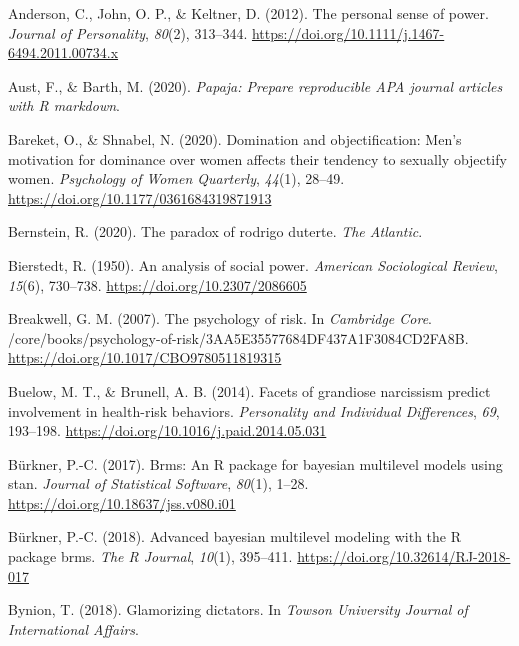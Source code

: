 \documentclass[
  donotrepeattitle,doc, 12pt, a4paper,floatsintext]{apa7}
\newlength{\cslhangindent}
\newlength{\cslentryspacingunit} %
\newenvironment{CSLReferences}[2] %
 {%
  \setlength{\parindent}{0pt}
  \ifodd #1
  \let\oldpar\par
  \def\par{\hangindent=\cslhangindent\oldpar}
  \fi
  \setlength{\parskip}{#2\cslentryspacingunit}
 }%
 {}
\begin{document}
\hypertarget{refs}{}
\begin{CSLReferences}{1}{0}
\leavevmode{}%
Anderson, C., John, O. P., \& Keltner, D. (2012). The personal sense of power. \emph{Journal of Personality}, \emph{80}(2), 313--344. \url{https://doi.org/10.1111/j.1467-6494.2011.00734.x}

\leavevmode{}%
Aust, F., \& Barth, M. (2020). \emph{Papaja: Prepare reproducible {APA} journal articles with {R} markdown}.

\leavevmode{}%
Bareket, O., \& Shnabel, N. (2020). Domination and objectification: Men's motivation for dominance over women affects their tendency to sexually objectify women. \emph{Psychology of Women Quarterly}, \emph{44}(1), 28--49. \url{https://doi.org/10.1177/0361684319871913}

\leavevmode{}%
Bernstein, R. (2020). The paradox of rodrigo duterte. \emph{The Atlantic}.

\leavevmode{}%
Bierstedt, R. (1950). An analysis of social power. \emph{American Sociological Review}, \emph{15}(6), 730--738. \url{https://doi.org/10.2307/2086605}

\leavevmode{}%
Breakwell, G. M. (2007). The psychology of risk. In \emph{Cambridge Core}. /core/books/psychology-of-risk/3AA5E35577684DF437A1F3084CD2FA8B. \url{https://doi.org/10.1017/CBO9780511819315}

\leavevmode{}%
Buelow, M. T., \& Brunell, A. B. (2014). Facets of grandiose narcissism predict involvement in health-risk behaviors. \emph{Personality and Individual Differences}, \emph{69}, 193--198. \url{https://doi.org/10.1016/j.paid.2014.05.031}

\leavevmode{}%
Bürkner, P.-C. (2017). Brms: An {R} package for bayesian multilevel models using stan. \emph{Journal of Statistical Software}, \emph{80}(1), 1--28. \url{https://doi.org/10.18637/jss.v080.i01}

\leavevmode{}%
Bürkner, P.-C. (2018). Advanced bayesian multilevel modeling with the {R} package brms. \emph{The R Journal}, \emph{10}(1), 395--411. \url{https://doi.org/10.32614/RJ-2018-017}

\leavevmode{}%
Bynion, T. (2018). Glamorizing dictators. In \emph{Towson University Journal of International Affairs}.


\end{CSLReferences}
\end{document}
